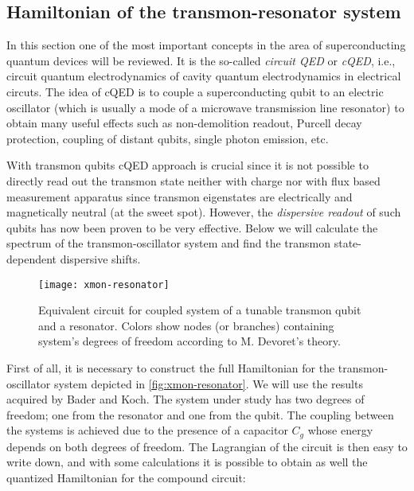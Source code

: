 \subsection{Hamiltonian of the transmon-resonator system}

In this section one of the most important concepts in the area of superconducting quantum devices will be reviewed. It is the so-called \textit{circuit QED} or \textit{cQED}, i.e., circuit quantum electrodynamics of cavity quantum electrodynamics in electrical circuts\cite{Blais2004}. The idea of cQED is to couple a superconducting qubit to an electric oscillator (which is usually a mode of a microwave transmission line resonator) to obtain many useful effects such as non-demolition readout\cite{Blais2004}, Purcell decay protection\cite{Koch2007}, coupling of distant qubits\cite{Majer2007}, single photon emission\cite{bozyigit2011}, etc.

With transmon qubits cQED approach is crucial since it is not possible to directly read out the transmon state neither with charge nor with flux based measurement apparatus since transmon eigenstates are electrically and magnetically neutral (at the sweet spot). However, the \textit{dispersive readout}\cite{Blais2004} of such qubits has now been proven to be very effective. Below we will calculate the spectrum of the transmon-oscillator system and find the transmon state-dependent dispersive shifts.

\begin{figure}
\centering
\texttt{[image: xmon-resonator]}
\caption{Equivalent circuit for coupled system of a tunable transmon qubit and a resonator. Colors show nodes (or branches) containing system's degrees of freedom according to M. Devoret's theory\cite{Devoret1995}.}
\label{fig:xmon-resonator}
\end{figure}

First of all, it is necessary to construct the full Hamiltonian for the transmon-oscillator system depicted in \autoref{fig:xmon-resonator}. We will use the results acquired by Bader\cite{Bader2013} and Koch\cite{Koch2007}. The system under study has two degrees of freedom; one from the resonator and one from the qubit. The coupling between the systems is achieved due to the presence of a capacitor $C_g$ whose energy depends on both degrees of freedom. The Lagrangian of the circuit is then easy to write down, and with some calculations it is possible to obtain as well the quantized Hamiltonian for the compound circuit:

